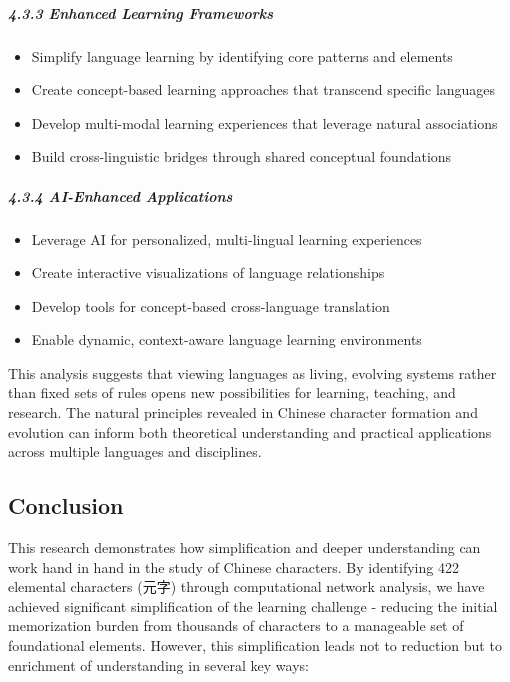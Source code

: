 \documentclass[
  11pt,
  letterpaper,
]{article}
\providecommand{\tightlist}{%
  \setlength{\itemsep}{0pt}\setlength{\parskip}{0pt}}
\begin{document}
\subparagraph{4.3.3 Enhanced Learning
Frameworks}\label{enhanced-learning-frameworks}

\begin{itemize}
\tightlist
\item
  Simplify language learning by identifying core patterns and elements
\item
  Create concept-based learning approaches that transcend specific
  languages
\item
  Develop multi-modal learning experiences that leverage natural
  associations
\item
  Build cross-linguistic bridges through shared conceptual foundations
\end{itemize}

\subparagraph{4.3.4 AI-Enhanced
Applications}\label{ai-enhanced-applications}

\begin{itemize}
\tightlist
\item
  Leverage AI for personalized, multi-lingual learning experiences
\item
  Create interactive visualizations of language relationships
\item
  Develop tools for concept-based cross-language translation
\item
  Enable dynamic, context-aware language learning environments
\end{itemize}

This analysis suggests that viewing languages as living, evolving
systems rather than fixed sets of rules opens new possibilities for
learning, teaching, and research. The natural principles revealed in
Chinese character formation and evolution can inform both theoretical
understanding and practical applications across multiple languages and
disciplines.

\subsection{Conclusion}\label{conclusion}

This research demonstrates how simplification and deeper understanding
can work hand in hand in the study of Chinese characters. By identifying
422 elemental characters (元字) through computational network analysis,
we have achieved significant simplification of the learning challenge -
reducing the initial memorization burden from thousands of characters to
a manageable set of foundational elements. However, this simplification
leads not to reduction but to enrichment of understanding in several key
ways:
\end{document}
